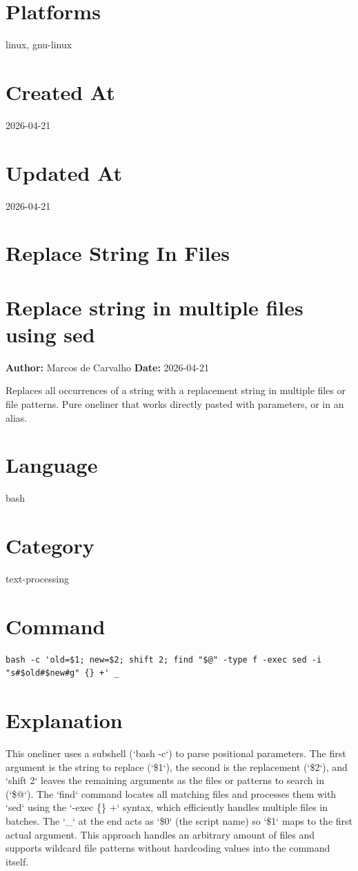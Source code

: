 \documentclass[openany]{book}
\begin{document}
\section*{Platforms}
linux, gnu-linux

\section*{Created At}
2026-04-21

\section*{Updated At}
2026-04-21

\section{Replace String In Files}
\section*{Replace string in multiple files using sed}
\textbf{Author:} Marcos de Carvalho \hfill \textbf{Date:} 2026-04-21

\noindent Replaces all occurrences of a string with a replacement string in multiple files or file patterns. Pure oneliner that works directly pasted with parameters, or in an alias.

\section*{Language}
bash

\section*{Category}
text-processing

\section*{Command}
\begin{lstlisting}
bash -c 'old=$1; new=$2; shift 2; find "$@" -type f -exec sed -i "s#$old#$new#g" {} +' _
\end{lstlisting}

\section*{Explanation}
This oneliner uses a subshell (`bash -c`) to parse positional parameters. The first argument is the string to replace (`\$1`), the second is the replacement (`\$2`), and `shift 2` leaves the remaining arguments as the files or patterns to search in (`\$@`). The `find` command locates all matching files and processes them with `sed` using the `-exec \{\} +` syntax, which efficiently handles multiple files in batches. The `\_` at the end acts as `\$0` (the script name) so `\$1` maps to the first actual argument. This approach handles an arbitrary amount of files and supports wildcard file patterns without hardcoding values into the command itself.
\end{document}
